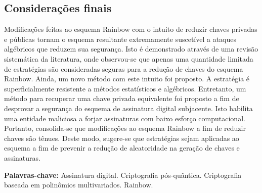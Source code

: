 \documentclass[english]{ufsc-thesis-rn46-2019/ufsc-thesis-rn46-2019}
\theoremstyle{definition}
\begin{document}
\begin{resumo}
  \section*{Considerações finais}
  Modificações feitas ao esquema Rainbow com o intuito de reduzir chaves
  privadas e públicas tornam o esquema resultante extremamente suscetível a
  ataques algébricos que reduzem sua segurança. Isto é demonstrado através de
  uma revisão sistemática da literatura, onde observou-se que apenas uma
  quantidade limitada de estratégias são consideradas seguras para a redução de
  chaves do esquema Rainbow. Ainda, um novo método com este intuito foi
  proposto. A estratégia é superficialmente resistente a métodos estatísticos e
  algébricos. Entretanto, um método para recuperar uma chave privada
  equivalente foi proposto a fim de desprovar a segurança do esquema de
  assinatura digital subjacente. Isto habilita uma entidade maliciosa a forjar
  assinaturas com baixo esforço computacional. Portanto, consolida-se que
  modificações ao esquema Rainbow a fim de reduzir chaves são tênues. Deste
  modo, sugere-se que estratégias sejam aplicadas ao esquema a fim de prevenir
  a redução de aleatoridade na geração de chaves e assinaturas.

  \vspace{\baselineskip}
  \textbf{Palavras-chave:} Assinatura digital. Criptografia pós-quântica.
  Criptografia baseada em polinômios multivariados. Rainbow.
\end{resumo}
\end{document}
